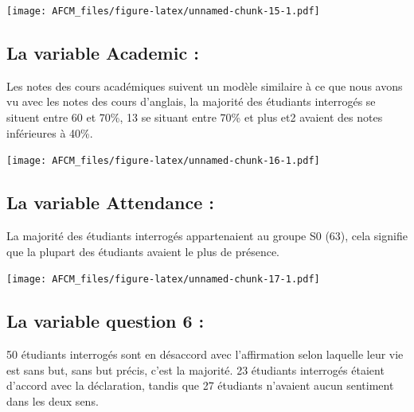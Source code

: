 \documentclass[
]{article}
\newenvironment{Shaded}{\begin{snugshade}}{\end{snugshade}}
\newcommand{\FunctionTok}[1]{\textcolor[rgb]{0.00,0.00,0.00}{#1}}
\newcommand{\NormalTok}[1]{#1}
\newcommand{\SpecialCharTok}[1]{\textcolor[rgb]{0.00,0.00,0.00}{#1}}
\newcommand{\StringTok}[1]{\textcolor[rgb]{0.31,0.60,0.02}{#1}}
\begin{document}
\texttt{[image: AFCM\_files/figure-latex/unnamed-chunk-15-1.pdf]}

\hypertarget{la-variable-academic}{%
\subsection{La variable Academic :}\label{la-variable-academic}}

Les notes des cours académiques suivent un modèle similaire à ce que
nous avons vu avec les notes des cours d'anglais, la majorité des
étudiants interrogés se situent entre 60 et 70\%, 13 se situant entre
70\% et plus et2 avaient des notes inférieures à 40\%.

\begin{Shaded}
\end{Shaded}

\texttt{[image: AFCM\_files/figure-latex/unnamed-chunk-16-1.pdf]}

\hypertarget{la-variable-attendance}{%
\subsection{La variable Attendance :}\label{la-variable-attendance}}

La majorité des étudiants interrogés appartenaient au groupe S0 (63),
cela signifie que la plupart des étudiants avaient le plus de présence.

\begin{Shaded}
\end{Shaded}

\texttt{[image: AFCM\_files/figure-latex/unnamed-chunk-17-1.pdf]}

\hypertarget{la-variable-question-6}{%
\subsection{La variable question 6 :}\label{la-variable-question-6}}

50 étudiants interrogés sont en désaccord avec l'affirmation selon
laquelle leur vie est sans but, sans but précis, c'est la majorité. 23
étudiants interrogés étaient d'accord avec la déclaration, tandis que 27
étudiants n'avaient aucun sentiment dans les deux sens.
\end{document}
